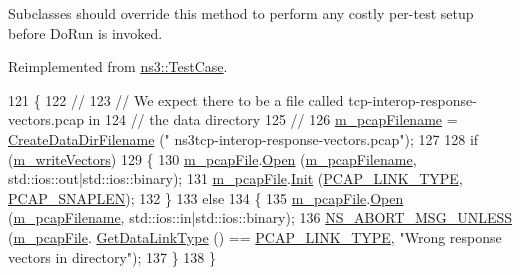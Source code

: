 Subclasses should override this method to perform any costly per-\/test setup before Do\+Run is invoked. 

Reimplemented from \hyperlink{classns3_1_1TestCase_a4a7e32ad32a10a508910815cd38e9177}{ns3\+::\+Test\+Case}.


\begin{DoxyCode}
121 \{
122   \textcolor{comment}{//}
123   \textcolor{comment}{// We expect there to be a file called tcp-interop-response-vectors.pcap in}
124   \textcolor{comment}{// the data directory}
125   \textcolor{comment}{//}
126   \hyperlink{classNs3TcpInteroperabilityTestCase_a207e7f877ef9921efefd3f20d6f58bce}{m\_pcapFilename} = \hyperlink{classns3_1_1TestCase_a3e4d216ff392a43418f26bb3e5b0f16d}{CreateDataDirFilename} (\textcolor{stringliteral}{"
      ns3tcp-interop-response-vectors.pcap"});
127 
128   \textcolor{keywordflow}{if} (\hyperlink{classNs3TcpInteroperabilityTestCase_a05b2ce8a52b36d9924ad9c7fda1168a9}{m\_writeVectors})
129     \{
130       \hyperlink{classNs3TcpInteroperabilityTestCase_a0d3ad7f3621d79aa2db483829c3d04fc}{m\_pcapFile}.\hyperlink{classns3_1_1PcapFile_a064e8494e28e823d0bb4e40549f9f483}{Open} (\hyperlink{classNs3TcpInteroperabilityTestCase_a207e7f877ef9921efefd3f20d6f58bce}{m\_pcapFilename}, std::ios::out|std::ios::binary);
131       \hyperlink{classNs3TcpInteroperabilityTestCase_a0d3ad7f3621d79aa2db483829c3d04fc}{m\_pcapFile}.\hyperlink{classns3_1_1PcapFile_a80c8adea1baa66e3f730df2927b0fc9b}{Init} (\hyperlink{ns3tcp-interop-test-suite_8cc_a1d33ea10cde9143eb9b36be021f3739e}{PCAP\_LINK\_TYPE}, \hyperlink{ns3tcp-interop-test-suite_8cc_ae9a6b49b98d0c7917dda456f6771d2e1}{PCAP\_SNAPLEN});
132     \}
133   \textcolor{keywordflow}{else}
134     \{
135       \hyperlink{classNs3TcpInteroperabilityTestCase_a0d3ad7f3621d79aa2db483829c3d04fc}{m\_pcapFile}.\hyperlink{classns3_1_1PcapFile_a064e8494e28e823d0bb4e40549f9f483}{Open} (\hyperlink{classNs3TcpInteroperabilityTestCase_a207e7f877ef9921efefd3f20d6f58bce}{m\_pcapFilename}, std::ios::in|std::ios::binary);
136       \hyperlink{group__fatal_ga0bd3f62c55e7347ff814572f3aaa3864}{NS\_ABORT\_MSG\_UNLESS} (\hyperlink{classNs3TcpInteroperabilityTestCase_a0d3ad7f3621d79aa2db483829c3d04fc}{m\_pcapFile}.
      \hyperlink{classns3_1_1PcapFile_aa3795e9a87e7a4151fb4d30747eaa072}{GetDataLinkType} () == \hyperlink{ns3tcp-interop-test-suite_8cc_a1d33ea10cde9143eb9b36be021f3739e}{PCAP\_LINK\_TYPE}, \textcolor{stringliteral}{"Wrong response vectors in directory"});
137     \}
138 \}
\end{DoxyCode}


